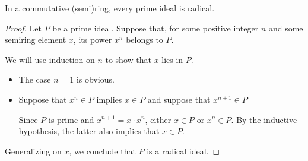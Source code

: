 \begin{proposition}\label{thm:prime_ideal_is_radical}
  In a \hyperref[def:ring/commutative]{commutative (semi)ring}, every \hyperref[def:semiring_ideal/prime]{prime ideal} is \hyperref[def:radical_ideal]{radical}.
\end{proposition}
\begin{proof}
  Let \( P \) be a prime ideal. Suppose that, for some positive integer \( n \) and some semiring element \( x \), its power \( x^n \) belongs to \( P \).

  We will use induction on \( n \) to show that \( x \) lies in \( P \).
  \begin{itemize}
    \item The case \( n = 1 \) is obvious.
    \item Suppose that \( x^n \in P \) implies \( x \in P \) and suppose that \( x^{n+1} \in P \)

    Since \( P \) is prime and \( x^{n+1} = x \cdot x^n \), either \( x \in P \) or \( x^n \in P \). By the inductive hypothesis, the latter also implies that \( x \in P \).
  \end{itemize}

  Generalizing on \( x \), we conclude that \( P \) is a radical ideal.
\end{proof}


